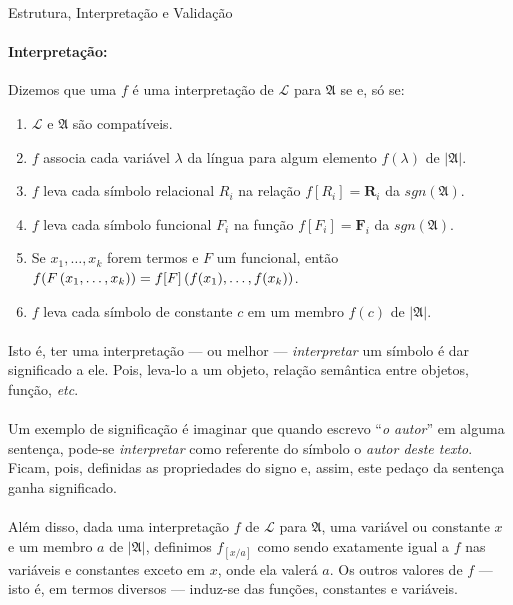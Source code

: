 \begin{definition}{Estrutura, Interpretação e Validação}
        \paragraph{Interpretação:}
            Dizemos que uma $f$ é uma interpretação de $\mathcal{L}$ para $\mathfrak{A}$
            se e, só se:
            \begin{enumerate}[label=(\alph*)]
                \item $\mathcal{L}$ e $\mathfrak{A}$ são compatíveis.
                \item $f$ associa cada variável $\lambda$ da língua para algum 
                    elemento $f(\lambda)$ de $|\mathfrak{A}|$.
                \item $f$ leva cada símbolo relacional   ${R}_i$ na relação $f[{R}_i] = \mathbf{R}_i$ da $sgn(\mathfrak{A})$.
                \item $f$ leva cada símbolo funcional    ${F}_i$ na função  $f[{F}_i] = \mathbf{F}_i$ da $sgn(\mathfrak{A})$.
                \item Se ${x_1},{\ldots},{x_k}$ forem termos e $F$ um funcional, então\\
                    $f(F\POINT{x_1}{\ldots}{x_k}) = f[F]\POINT{f(x_1)}{\ldots}{f(x_k)}$.
                \item $f$ leva cada símbolo de constante $c$ em um membro   $f(c)$ de $|\mathfrak{A}|$.
            \end{enumerate}
        \paragraph{}
            Isto é, ter uma interpretação --- ou melhor --- \emph{interpretar} um 
            símbolo é dar significado a ele. Pois, leva-lo a um objeto, relação 
            semântica entre objetos, função, \emph{etc}.
        \paragraph{}
            Um exemplo de significação é imaginar que quando escrevo ``\emph{o 
            autor}'' em alguma sentença, pode-se \emph{interpretar} como referente do 
            símbolo o \emph{autor deste texto}. Ficam, pois, definidas as propriedades 
            do signo e, assim, este pedaço da sentença ganha significado.
        \paragraph{}
            Além disso, dada uma interpretação $f$ de $\mathcal{L}$ para $\mathfrak{A}$,
            uma variável ou constante $x$ e um membro $a$ de $|\mathfrak{A}|$, 
            definimos $f_{[x\slash a]}$ como sendo exatamente igual a $f$ nas variáveis 
            e constantes exceto em $x$, onde ela valerá $a$. Os outros valores de $f$ 
            --- isto é, em termos diversos --- induz-se das funções, constantes e variáveis.

\end{definition}

